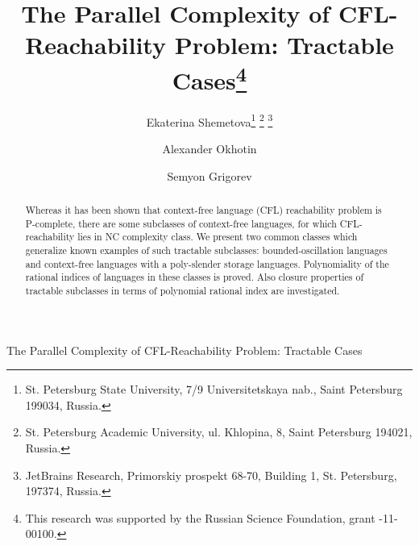 \documentclass{ws-ijfcs}
\begin{document}
{The Parallel Complexity of CFL-Reachability Problem:
Tractable Cases
}

%
\catchline{}{}{}{}{}
%

\title{The Parallel Complexity of CFL-Reachability Problem:
Tractable Cases\footnote{
This research was supported by the Russian Science Foundation, grant -11-00100.}}

\author{Ekaterina Shemetova\footnote{
St. Petersburg State University, 
7/9 Universitetskaya nab., Saint Petersburg 199034, Russia.}
\footnote{
St. Petersburg Academic University, 
ul. Khlopina, 8, Saint Petersburg 194021, Russia.}
\footnote{
JetBrains Research,
Primorskiy prospekt 68-70, Building 1, St. Petersburg, 197374, Russia.}
}

\address{
}

\author{Alexander Okhotin\footnotemark[2] }

\address{
}

\author{Semyon Grigorev\footnotemark[2] \footnotemark[4] }

\address{
}


\maketitle

\begin{history}
\end{history}

\begin{abstract}
Whereas it has been shown that  context-free language (CFL) reachability problem is P-complete, there are some subclasses of context-free languages, for which CFL-reachability lies in NC complexity class. We present two common classes which generalize known examples of such tractable subclasses: bounded-oscillation languages and context-free languages with a poly-slender storage languages. Polynomiality of the rational indices of languages in these classes is proved. Also closure properties of tractable subclasses in terms of polynomial rational index are investigated.
\end{abstract}
\end{document}
